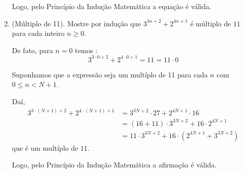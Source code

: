 \documentclass[a4paper,12pt]{article}
\begin{document}
\begin{enumerate}[label=1.\arabic*.]
    Logo, pelo Princípio da Indução Matemática a equação é válida.

    \item (Múltiplo de 11). Mostre por indução que $3^{3n+2}+2^{4n+1}$ é múltiplo de $11$ para 
    cada inteiro $n\ge 0$.

     De fato, para $ n = 0$ temos : 
    \[
      3^{3 \cdot 0 + 2 }+ 2^{4 \cdot 0 + 1} = 11 = 11 \cdot 0  
    \]

    Suponhamos que a expressão seja um multíplo de 11 para cada $n$ com $0 \leq n < N + 1$.

    Daí,    
    \begin{align*}
      3^{3 \cdot (N+1) + 2 } + 2^{4 \cdot (N+1) + 1} &= 3^{3N + 2 } \cdot 27 + 2^{4N + 1} \cdot 16 \\
      &= (16 + 11) \cdot 3^{3N + 2} + 16 \cdot 2^{4N + 1} \\
      &= 11 \cdot 3^{3N + 2} + 16 \cdot (2^{4N + 1} + 3^{3N + 2})
    \end{align*}
    que é um multíplo de $11$.

    Logo, pelo Princípio da Indução Matemática a afirmação é válida.

  \end{enumerate}
\end{document}

